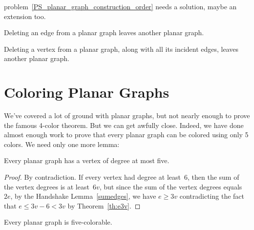 \begin{editingnotes}
problem~\ref{PS_planar_graph_construction_order} needs a solution, maybe
an extension too.
\end{editingnotes}

\begin{editingnotes}

\begin{lemma}%
Deleting an edge from a planar graph leaves another planar graph.
\end{lemma}

\begin{corollary}%
Deleting a vertex from a planar graph, along with all its incident
edges, leaves another planar graph.
\end{corollary}
\end{editingnotes}

\section{Coloring Planar Graphs}

We've covered a lot of ground with planar graphs, but not nearly
enough to prove the famous 4-color theorem.  But we can get awfully
close.  Indeed, we have done almost enough work to prove that every
planar graph can be colored using only 5 colors.  We need only one
more lemma:
\begin{lemma}\label{lem:pg5}
Every planar graph has a vertex of degree at most five.
\end{lemma}

\begin{proof}
By contradiction.
If every vertex had degree at least~6, then the sum of the vertex
degrees is at least~$6v$, but since the sum of the vertex degrees
equals~$2e$, by the Handshake Lemma~\ref{sumedges}, we have $e
\ge 3v$ contradicting the fact that $e \le 3v - 6 < 3v$ by
Theorem~\ref{th:e3v}.
\end{proof}

\begin{theorem}
Every planar graph is five-colorable.
\end{theorem}

